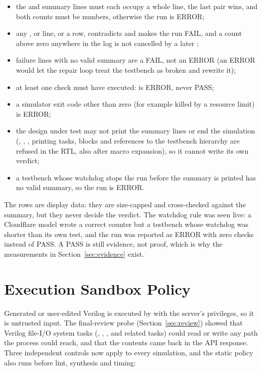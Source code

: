 \begin{itemize}
\item the  and  summary lines must each occupy a whole
line, the last pair wins, and both counts must be numbers, otherwise the run is
ERROR;
\item any ,  or  line, or a  row,
contradicts  and makes the run FAIL, and a  count above
zero anywhere in the log is not cancelled by a later ;
\item failure lines with no valid summary are a FAIL, not an ERROR (an ERROR would let
the repair loop treat the testbench as broken and rewrite it);
\item at least one check must have executed:  is ERROR, never PASS;
\item a simulator exit code other than zero (for example killed by a resource limit)
is ERROR;
\item the design under test may not print the summary lines or end the simulation
(, , , printing tasks,  blocks and
references to the testbench hierarchy are refused in the RTL, also after macro
expansion), so it cannot write its own verdict;
\item a testbench whose watchdog stops the run before the summary is printed has no
valid summary, so the run is ERROR.
\end{itemize}

The  rows are display data: they are size-capped and cross-checked
against the summary, but they never decide the verdict. The watchdog rule was seen
live: a Cloudflare model wrote a correct counter but a testbench whose watchdog was
shorter than its own test, and the run was reported as ERROR with zero checks
instead of PASS. A PASS is still evidence, not proof, which is why the measurements
in Section~\ref{sec:evidence} exist.

\section{Execution Sandbox Policy}
\label{sec:sandbox}
Generated or user-edited Verilog is executed by  with the server's privileges, so it is untrusted input. The final-review probe (Section~\ref{sec:review}) showed that Verilog file-I/O system tasks (, , ,  and related tasks) could read or write any path the process could reach, and that the contents came back in the API response. Three independent controls now apply to every simulation, and the static policy also runs before lint, synthesis and timing:

